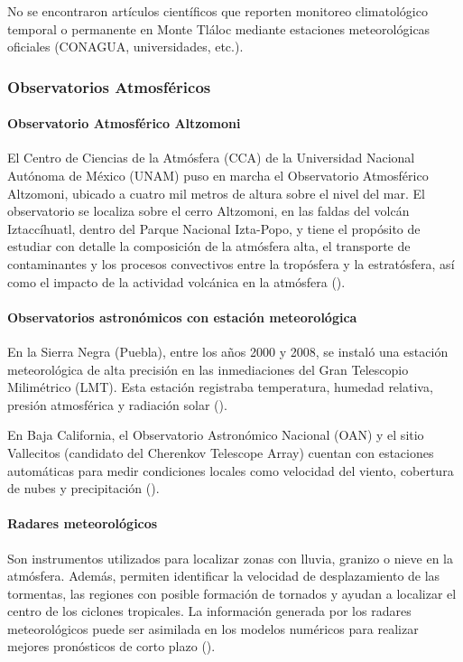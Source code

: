 No se encontraron artículos científicos que reporten monitoreo climatológico temporal o permanente en Monte Tláloc mediante estaciones meteorológicas oficiales (CONAGUA, universidades, etc.).

\subsubsection*{Observatorios Atmosféricos}

\paragraph{Observatorio Atmosférico Altzomoni}

El Centro de Ciencias de la Atmósfera (CCA) de la Universidad Nacional Autónoma de México (UNAM) puso en marcha el Observatorio Atmosférico Altzomoni, ubicado a cuatro mil metros de altura sobre el nivel del mar. El observatorio se localiza sobre el cerro Altzomoni, en las faldas del volcán Iztaccíhuatl, dentro del Parque Nacional Izta-Popo, y tiene el propósito de estudiar con detalle la composición de la atmósfera alta, el transporte de contaminantes y los procesos convectivos entre la tropósfera y la estratósfera, así como el impacto de la actividad volcánica en la atmósfera  (\cite{sedema2025}).

\paragraph{Observatorios astronómicos con estación meteorológica}

En la Sierra Negra (Puebla), entre los años 2000 y 2008, se instaló una estación meteorológica de alta precisión en las inmediaciones del Gran Telescopio Milimétrico (LMT). Esta estación registraba temperatura, humedad relativa, presión atmosférica y radiación solar  (\cite{granicus2009}).

En Baja California, el Observatorio Astronómico Nacional (OAN) y el sitio Vallecitos (candidato del Cherenkov Telescope Array) cuentan con estaciones automáticas para medir condiciones locales como velocidad del viento, cobertura de nubes y precipitación (\cite{garcia2020, vallecitos2016}).

\paragraph{Radares meteorológicos}
Son instrumentos utilizados para localizar zonas con lluvia, granizo o nieve en la atmósfera. Además, permiten identificar la velocidad de desplazamiento de las tormentas, las regiones con posible formación de tornados y ayudan a localizar el centro de los ciclones tropicales. La información generada por los radares meteorológicos puede ser asimilada en los modelos numéricos para realizar mejores pronósticos de corto plazo (\cite{smn2025}).


